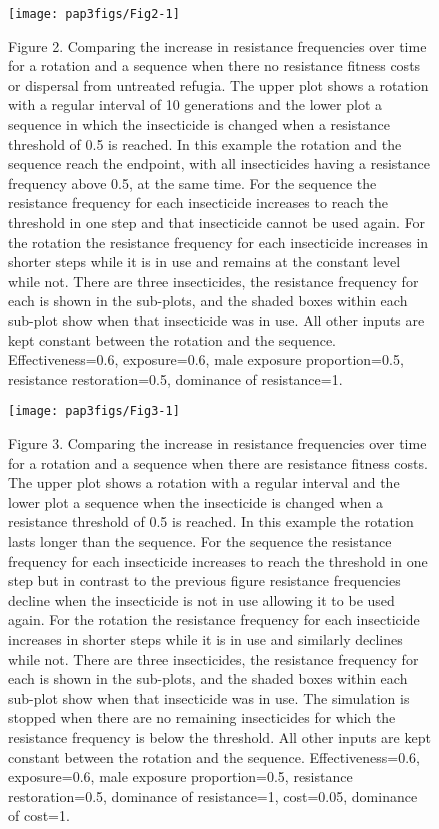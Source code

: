\documentclass[11pt,]{article}
\begin{document}
\begin{figure}

{\centering \texttt{[image: pap3figs/Fig2-1]} 

}

\caption{Figure 2. Comparing the increase in resistance frequencies over time for a rotation and a sequence when there no resistance fitness costs or dispersal from untreated refugia. The upper plot shows a rotation with a regular interval of 10 generations and the lower plot a sequence in which the insecticide is changed when a resistance threshold of 0.5 is reached. In this example the rotation and the sequence reach the endpoint, with all insecticides having a resistance frequency above 0.5, at the same time. For the sequence the resistance frequency for each insecticide increases to reach the threshold in one step and that insecticide cannot be used again. For the rotation the resistance frequency for each insecticide increases in shorter steps while it is in use and remains at the constant level while not. There are three insecticides, the resistance frequency for each is shown in the sub-plots, and the shaded boxes within each sub-plot show when that insecticide was in use. All other inputs are kept constant between the rotation and the sequence. Effectiveness=0.6, exposure=0.6, male exposure proportion=0.5, resistance restoration=0.5, dominance of resistance=1.}\label{fig:Fig2}
\end{figure}

\pagebreak

\begin{figure}

{\centering \texttt{[image: pap3figs/Fig3-1]} 

}

\caption{Figure 3. Comparing the increase in resistance frequencies over time for a rotation and a sequence when there are resistance fitness costs. The upper plot shows a rotation with a regular interval and the lower plot a sequence when the insecticide is changed when a resistance threshold of 0.5 is reached. In this example the rotation lasts longer than the sequence. For the sequence the resistance frequency for each insecticide increases to reach the threshold in one step but in contrast to the previous figure resistance frequencies decline when the insecticide is not in use allowing it to be used again. For the rotation the resistance frequency for each insecticide increases in shorter steps while it is in use and similarly declines  while not. There are three insecticides, the resistance frequency for each is shown in the sub-plots, and the shaded boxes within each sub-plot show when that insecticide was in use. The simulation is stopped when there are no remaining insecticides for which the resistance frequency is below the threshold. All other inputs are kept constant between the rotation and the sequence. Effectiveness=0.6, exposure=0.6, male exposure proportion=0.5, resistance restoration=0.5, dominance of resistance=1, cost=0.05, dominance of cost=1.}\label{fig:Fig3}
\end{figure}
\end{document}

